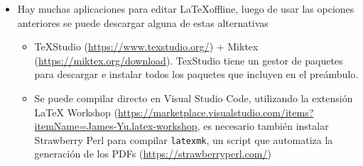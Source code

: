 \begin{itemize}
\begin{itemize}
        \item Activar el modo draft para trabajar colaborativamente y corroborar que funciona el código
        \item Si el modo draft no es suficiente, se pueden comentar bloques de código con los comandos \textit{begin{comment}} y \textit{end{comment}}
    \end{itemize}
    \item Hay muchas aplicaciones para editar \LaTeX offline, luego de usar las opciones anteriores se puede descargar alguna de estas alternativas 
    \begin{itemize}
        \item TeXStudio (\url{https://www.texstudio.org/}) + Miktex (\url{https://miktex.org/download}). TexStudio tiene un gestor de paquetes para descargar e instalar todos los paquetes que incluyen en el preámbulo.
        \item Se puede compilar directo en Visual Studio Code, utilizando la extensión LaTeX Workshop (\url{https://marketplace.visualstudio.com/items?itemName=James-Yu.latex-workshop}, es necesario también instalar Strawberry Perl para compilar \texttt{latexmk}, un script que automatiza la generación de los PDFs (\url{https://strawberryperl.com/})
    \end{itemize}
    

\end{itemize}

